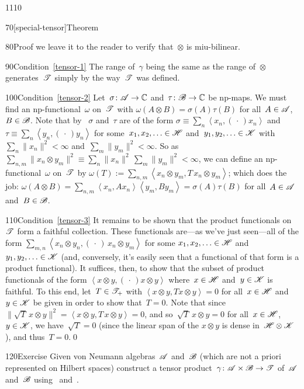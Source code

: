 \begin{parsec}{1110}
\begin{point}{70}[special-tensor]{Theorem}
\begin{point}{80}{Proof}
we leave it to the reader to verify that~$\otimes$
is miu-bilinear.
\begin{point}{90}{Condition~\ref{tensor-1}}%
The range of~$\gamma$ being the same as the range of~$\otimes$
generates~$\mathscr{T}$ 
simply by the way~$\mathscr{T}$ was defined.
\end{point}
\begin{point}{100}{Condition~\ref{tensor-2}}%
Let~$\sigma\colon \mathscr{A}\to\mathbb{C}$
and~$\tau\colon \mathscr{B}\to\mathbb{C}$ be np-maps.
We must find an np-functional~$\omega$ on~$\mathscr{T}$
with $\omega(A\otimes B)=\sigma(A)\tau(B)$
for all~$A\in \mathscr{A}$, $B\in \mathscr{B}$.
Note that by~
$\sigma$ and~$\tau$ are of the form
$\sigma\equiv\sum_n \left<x_n,(\,\cdot\,)x_n\right>$
and~$\tau\equiv\sum_n \left<y_n,(\,\cdot\,)y_n\right>$
for some~$x_1,x_2,\dotsc\in\mathscr{H}$
and~$y_1,y_2,\dotsc\in\mathscr{K}$
with~$\sum_n\|x_n\|^2<\infty$
and~$\sum_m\|y_m\|^2 <\infty$.
So as~$\sum_{n,m}\|x_n\otimes y_m\|^2\equiv\sum_n \|x_n\|^2\,
\sum_m\|y_m\|^2 <\infty$,
we can define
an np-functional~$\omega$ on~$\mathscr{T}$
by $\omega(T):= \sum_{n,m} \left<x_n\otimes y_m,
T\,x_n\otimes y_m\right>$;
which does the job:  $\omega(A\otimes B)
= \sum_{n,m} \left<x_n, Ax_n\right> \left<y_m,By_m\right>
= \sigma(A)\tau(B)$
for all~$A\in\mathscr{A}$ and~$B\in\mathscr{B}$.
\end{point}
\begin{point}{110}{Condition~\ref{tensor-3}}%
It remains to be shown that the
product functionals
on~$\mathscr{T}$ form a faithful collection.
These functionals are---as we've just seen---all
of the form
$\sum_{m,n}\left<x_n\otimes y_n,(\,\cdot\,)\,x_n\otimes y_m\right>$
for some $x_1,x_2,\dotsc\in\mathscr{H}$
and~$y_1,y_2,\dotsc\in\mathscr{K}$
(and, conversely, it's easily seen
that a functional
of that form
is a product functional).
It suffices,
then,
to show that the subset of
product functionals
of the  form $\left<x\otimes y,(\,\cdot\,)x\otimes y\right>$
where~$x\in\mathscr{H}$ and~$y\in\mathscr{K}$ is faithful.
To this end,
let~$T\in\mathscr{T}_+$
with $\left< x\otimes y, Tx\otimes y\right>=0$
for all~$x\in\mathscr{H}$ and~$y\in\mathscr{K}$ be given
in order to show that~$T=0$.
Note that since
$\|\sqrt{T}\,x\otimes y\|^2=\left<x\otimes y,T\,x\otimes y\right>
=0$, and so~$\sqrt{T}\,x\otimes y=0$
for all~$x\in\mathscr{H}$, $y\in \mathscr{K}$,
we have~$\sqrt{T}=0$ (since the linear
span of the $x\otimes y$ is dense in~$\mathscr{H}\otimes\mathscr{K}$),
and thus~$T=0$.\qed
\end{point}
\end{point}
\end{point}
\begin{point}{120}{Exercise}%
%
Given von Neumann algebras~$\mathscr{A}$ and~$\mathscr{B}$
(which are not a priori represented on Hilbert spaces)
construct a tensor product~$\gamma\colon \mathscr{A}\times \mathscr{B}\to\mathscr{T}$
of~$\mathscr{A}$ and~$\mathscr{B}$
using~ and~.
\end{point}
\end{parsec}

